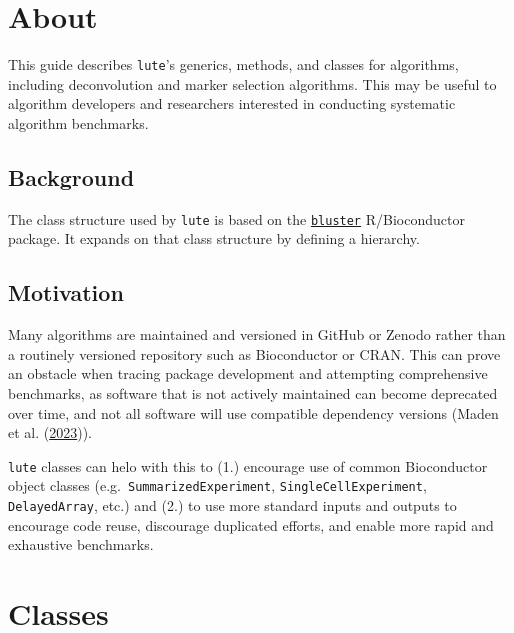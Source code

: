 \documentclass[]{article}
\author{Sean K. Maden and Stephanie C. Hicks}
\date{17 January, 2024}
\begin{document}
\maketitle


\hypertarget{about}{%
\section{About}\label{about}}

This guide describes \texttt{lute}'s generics, methods, and classes for algorithms,
including deconvolution and marker selection algorithms. This may be useful to
algorithm developers and researchers interested in conducting systematic
algorithm benchmarks.

\hypertarget{background}{%
\subsection{Background}\label{background}}

The class structure used by \texttt{lute} is based on the \href{https://bioconductor.org/packages/release/bioc/html/bluster.html}{\texttt{bluster}} R/Bioconductor
package. It expands on that class structure by defining a hierarchy.

\hypertarget{motivation}{%
\subsection{Motivation}\label{motivation}}

Many algorithms are maintained and versioned in GitHub or Zenodo rather than a
routinely versioned repository such as Bioconductor or CRAN. This can prove an
obstacle when tracing package development and attempting comprehensive
benchmarks, as software that is not actively maintained can become deprecated
over time, and not all software will use compatible dependency versions
(Maden et al. (\protect\hyperlink{ref-maden_challenges_2023}{2023})).

\texttt{lute} classes can helo with this to (1.) encourage use of common Bioconductor
object classes (e.g.~\texttt{SummarizedExperiment}, \texttt{SingleCellExperiment},
\texttt{DelayedArray}, etc.) and (2.) to use more standard inputs and outputs to
encourage code reuse, discourage duplicated efforts, and enable more rapid and
exhaustive benchmarks.

\hypertarget{classes}{%
\section{Classes}\label{classes}}
\end{document}
